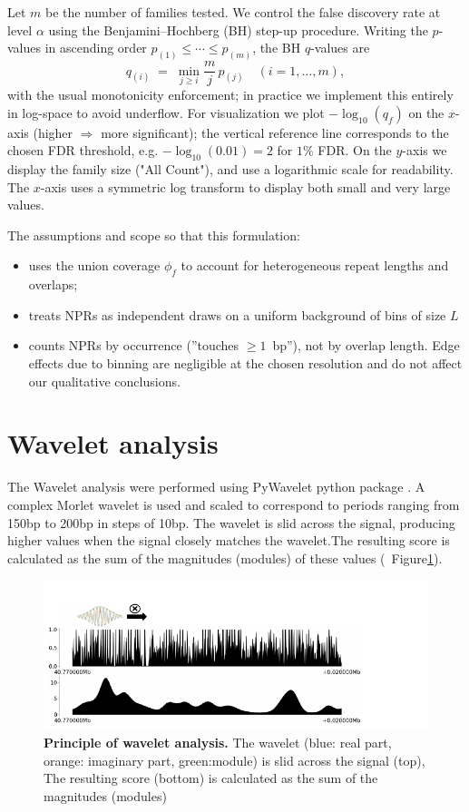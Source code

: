 \documentclass[11pt]{book}
\begin{document}
Let $m$ be the number of families tested. 
We control the false discovery rate at level $\alpha$ using the Benjamini--Hochberg (BH) step-up procedure. 
Writing the $p$-values in ascending order $p_{(1)} \le \cdots \le p_{(m)}$, the BH $q$-values are
\[
q_{(i)} \;=\; \min_{j\ge i} \frac{m}{j}\, p_{(j)} \quad (i=1,\dots,m),
\]
with the usual monotonicity enforcement; in practice we implement this entirely in log-space to avoid underflow. 
For visualization we plot $-\log_{10}(q_f)$ on the $x$-axis (higher $\Rightarrow$ more significant); the vertical reference line corresponds to the chosen FDR threshold, e.g. $-\log_{10}(0.01)=2$ for $1\%$ FDR. 
On the $y$-axis we display the family size ("All Count"), and use a logarithmic scale for readability. 
The $x$-axis uses a symmetric log transform to display both small and very large values.

The assumptions and scope so that this formulation:
\begin{itemize}
    \item uses the union coverage $\phi_f$ to account for heterogeneous repeat lengths and overlaps;
    \item treats NPRs as independent draws on a uniform background of bins of size $L$
    \item counts NPRs by occurrence (''touches $\ge1$~bp''), not by overlap length. Edge effects due to binning are negligible at the chosen resolution and do not affect our qualitative conclusions.
\end{itemize}

\section{Wavelet analysis}
The Wavelet analysis were performed using PyWavelet python package \cite{lee_pywavelets_2019}. A complex Morlet wavelet is used and scaled to correspond to periods ranging from 150bp to 200bp in steps of 10bp. The wavelet is slid across the signal, producing higher values when the signal closely matches the wavelet.The resulting score is calculated as the sum of the magnitudes (modules) of these values (~Figure\ref{fig:wavelet_principle}).

\begin{figure}[htbp]
    \centering
    \includegraphics[width=1.2\textwidth]{Figures/Results/wavelet_principle.pdf}
    \caption{\textbf{Principle of wavelet analysis.} The wavelet (blue: real part, orange: imaginary part, green:module) is slid across the signal (top), The resulting score (bottom) is calculated as the sum of the magnitudes (modules)}
    \label{fig:wavelet_principle}
\end{figure}
\end{document}
